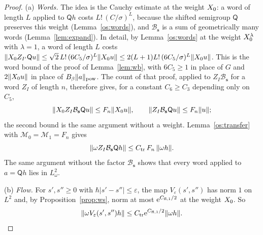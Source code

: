 \begin{proof}
\smallskip\noindent(a) \emph{Words.} The idea is the Cauchy estimate at the weight $X_0$: a word of length $L$ applied to
$\mathsf Qh$ costs $L!\,(C/\sigma)^L$, because the shifted semigroup $\mathsf Q$ preserves this weight (Lemma~\ref{os:words}), and
$\mathcal B_{\mathbf s}$ is a sum of geometrically many words (Lemma~\ref{lem:expand}). In detail, by Lemma~\ref{os:words} at the weight
$X_0^\lambda$ with $\lambda=1$, a word of length $L$ costs
$\lVert X_0 Z_{I'}\mathsf Qu\rVert\le\sqrt2\,L!\,(6C_5/\sigma)^L\lVert X_0 u\rVert\le2(L+1)L!\,(6C_5/\sigma)^L\lVert X_0 u\rVert$. This is the word bound
of the proof of Lemma~\ref{lem:wb}, with $6C_5\ge1$ in place of $G$ and $2\lVert X_0 u\rVert$ in place of $B_\beta\lVert a\rVert_{\mathrm{pow}}$. The count of that
proof, applied to $Z_I\mathcal B_{\mathbf s}$ for a word $Z_I$ of length $n$, therefore gives, for a constant $C_6\ge C_3$ depending only on $C_5$,
\[
  \lVert X_0 Z_I\mathcal B_{\mathbf s}\mathsf Qu\rVert\le F_n\lVert X_0 u\rVert,\qquad\lVert Z_I\mathcal B_{\mathbf s}\mathsf Qu\rVert\le F_n\lVert u\rVert ;
\]
the second bound is the same argument without a weight. Lemma~\ref{os:transfer} with $\mathcal M_0=\mathcal M_1=F_n$ gives
\begin{equation}\label{pc:wbw}
  \lVert \omega Z_I\mathcal B_{\mathbf s}\mathsf Qh\rVert\le C_{\mathrm{tr}}\,F_n\,\lVert \omega h\rVert.
\end{equation}
The same argument without the factor $\mathcal B_{\mathbf s}$ shows that every word applied to $a=\mathsf Qh$ lies in $L^2_{\omega}$.

\smallskip\noindent(b) \emph{Flow.} For $s',s''\ge0$ with $\hbar|s'-s''|\le\varepsilon$, the map $V_\varepsilon(s',s'')$ has norm $1$ on $L^2$ and, by
Proposition~\ref{prop:ws}, norm at most $\mathrm{e}^{C_{\mathrm{fl},1}/2}$ at the weight $X_0$. So
\begin{equation}\label{pc:flow}
  \lVert \omega V_\varepsilon(s',s'')h\rVert\le C_{\mathrm{tr}}\mathrm{e}^{C_{\mathrm{fl},1}/2}\lVert \omega h\rVert.
\end{equation}


\end{proof}
